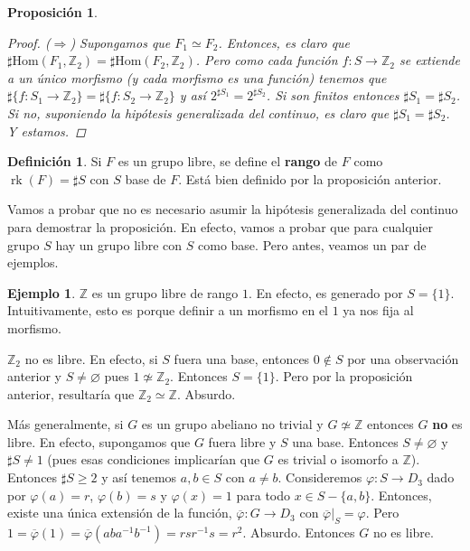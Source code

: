 \documentclass[12pt]{book}
\newtheorem{prop}[teo]{Proposición}
\theoremstyle{definition}
\newtheorem{defn}[teo]{Definición}
\newtheorem{ex}[teo]{Ejemplo}
\newcommand{\ZZ}{\mathbb{Z}}      %
\renewcommand{\hom}{\mathrm{Hom}}
\let\emptyset\varnothing
\DeclareMathOperator{\rank}{rk}
\begin{document}
\begin{prop}
\begin{proof}
($\Longrightarrow$) Supongamos que $F_1\simeq F_2$. Entonces, es claro que $\sharp \hom(F_1,\ZZ_2) = \sharp\hom(F_2,\ZZ_2)$. Pero como cada función $f:S\to\ZZ_2$ se extiende a un único morfismo (y cada morfismo es una función) tenemos que $\sharp \{f:S_1\to \ZZ_2\} = \sharp \{f:S_2\to\ZZ_2\}$ y así $2^{\sharp S_1} = 2^{\sharp S_2}$. Si son finitos entonces $\sharp S_1 =\sharp S_2$. Si no, suponiendo la hipótesis generalizada del continuo, es claro que $\sharp S_1 = \sharp S_2$. Y estamos.
\end{proof}
\end{prop}

\begin{defn}
Si $F$ es un grupo libre, se define el \textbf{rango} de $F$ como $\rank (F) = \sharp S$ con $S$ base de $F$. Está bien definido por la proposición anterior.
\end{defn}

Vamos a probar que no es necesario asumir la hipótesis generalizada del continuo para demostrar la proposición. En efecto, vamos a probar que para cualquier grupo $S$ hay un grupo libre con $S$ como base. Pero antes, veamos un par de ejemplos.

\begin{ex}
$\ZZ$ es un grupo libre de rango $1$. En efecto, es generado por $S=\{1\}$. Intuitivamente, esto es porque definir a un morfismo en el $1$ ya nos fija al morfismo.

$\ZZ_2$ no es libre. En efecto, si $S$ fuera una base, entonces $0\notin S$ por una observación anterior y $S\neq \emptyset$ pues $1\not\simeq \ZZ_2$. Entonces $S=\{1\}$. Pero por la proposición anterior, resultaría que $\ZZ_2\simeq \ZZ$. Absurdo.

Más generalmente, si $G$ es un grupo abeliano no trivial y $G\not\simeq \ZZ$ entonces $G$ \textbf{no} es libre. En efecto, supongamos que $G$ fuera libre y $S$ una base. Entonces $S\neq \emptyset$ y $\sharp S\neq 1$ (pues esas condiciones implicarían que $G$ es trivial o isomorfo a $\ZZ$). Entonces $\sharp S\geq 2$ y así tenemos $a,b\in S$ con $a\neq b$. Consideremos $\varphi : S\to D_3$ dado por $\varphi(a)=r$, $\varphi(b)=s$ y $\varphi(x) = 1$ para todo $x\in S-\{a,b\}$. Entonces, existe una única extensión de la función, $\overline{\varphi}:G\to D_3$ con $\left. \overline{\varphi}\right |_{S} = \varphi$. Pero $1 = \overline{\varphi}(1) = \overline{\varphi}(aba^{-1}b^{-1}) = rsr^{-1}s = r^2 $. Absurdo. Entonces $G$ no es libre.
\end{ex}
\end{document}
